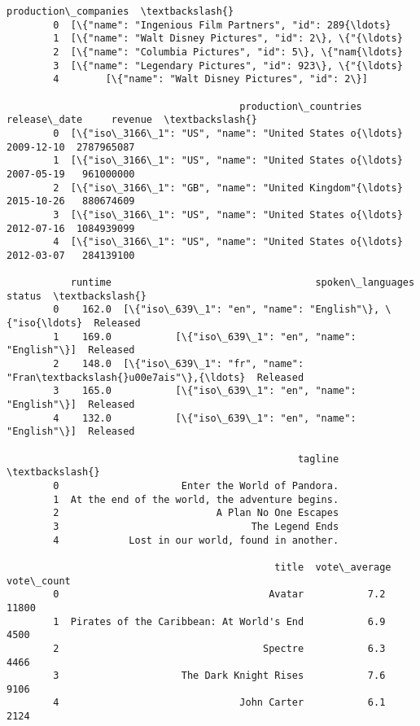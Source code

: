 \documentclass[11pt]{article}
\begin{document}
\begin{Verbatim}[commandchars=\\\{\}]
                                        production\_companies  \textbackslash{}
        0  [\{"name": "Ingenious Film Partners", "id": 289{\ldots}   
        1  [\{"name": "Walt Disney Pictures", "id": 2\}, \{"{\ldots}   
        2  [\{"name": "Columbia Pictures", "id": 5\}, \{"nam{\ldots}   
        3  [\{"name": "Legendary Pictures", "id": 923\}, \{"{\ldots}   
        4        [\{"name": "Walt Disney Pictures", "id": 2\}]   
        
                                        production\_countries release\_date     revenue  \textbackslash{}
        0  [\{"iso\_3166\_1": "US", "name": "United States o{\ldots}   2009-12-10  2787965087   
        1  [\{"iso\_3166\_1": "US", "name": "United States o{\ldots}   2007-05-19   961000000   
        2  [\{"iso\_3166\_1": "GB", "name": "United Kingdom"{\ldots}   2015-10-26   880674609   
        3  [\{"iso\_3166\_1": "US", "name": "United States o{\ldots}   2012-07-16  1084939099   
        4  [\{"iso\_3166\_1": "US", "name": "United States o{\ldots}   2012-03-07   284139100   
        
           runtime                                   spoken\_languages    status  \textbackslash{}
        0    162.0  [\{"iso\_639\_1": "en", "name": "English"\}, \{"iso{\ldots}  Released   
        1    169.0           [\{"iso\_639\_1": "en", "name": "English"\}]  Released   
        2    148.0  [\{"iso\_639\_1": "fr", "name": "Fran\textbackslash{}u00e7ais"\},{\ldots}  Released   
        3    165.0           [\{"iso\_639\_1": "en", "name": "English"\}]  Released   
        4    132.0           [\{"iso\_639\_1": "en", "name": "English"\}]  Released   
        
                                                  tagline  \textbackslash{}
        0                     Enter the World of Pandora.   
        1  At the end of the world, the adventure begins.   
        2                           A Plan No One Escapes   
        3                                 The Legend Ends   
        4            Lost in our world, found in another.   
        
                                              title  vote\_average  vote\_count  
        0                                    Avatar           7.2       11800  
        1  Pirates of the Caribbean: At World's End           6.9        4500  
        2                                   Spectre           6.3        4466  
        3                     The Dark Knight Rises           7.6        9106  
        4                               John Carter           6.1        2124  
\end{Verbatim}
            
\end{document}
